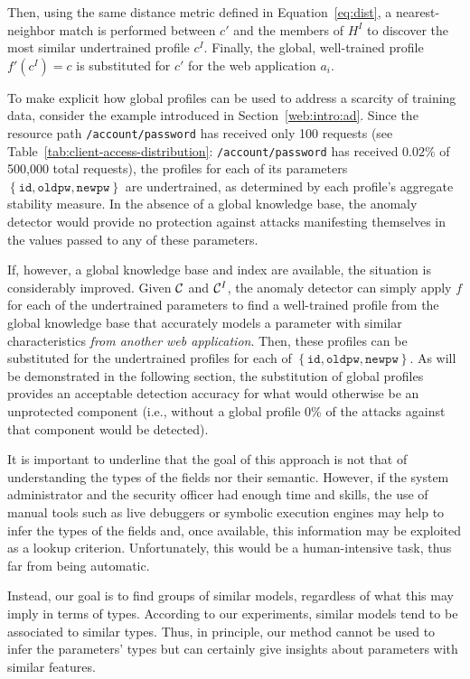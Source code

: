 Then, using the same distance metric defined in Equation~\eqref{eq:dist}, a nearest-neighbor match is performed between $c'$ and the members of $H^I$ to discover the most similar undertrained profile $c^I$.  Finally, the global, well-trained profile $f'\left(c^I\right)=c$ is substituted for $c'$ for the web application $a_i$.

To make explicit how global profiles can be used to address a scarcity
of training data, consider the example introduced in
Section~\ref{web:intro:ad}.  Since the resource path
\texttt{/account/password} has received only 100 requests (see
Table~\ref{tab:client-access-distribution}: \texttt{/account/password}
has received $0.02\%$ of 500,000 total requests), the profiles for
each of its parameters
$\left\{\mathtt{id},\mathtt{oldpw},\mathtt{newpw}\right\}$ are
undertrained, as determined by each profile's aggregate stability
measure.  In the absence of a global knowledge base, the anomaly
detector would provide no protection against attacks manifesting
themselves in the values passed to any of these parameters.

If, however, a global knowledge base and index are available, the situation is considerably improved.  Given $\mathcal{C}$ and $\mathcal{C}^I$, the anomaly detector can simply apply $f$ for each of the undertrained parameters to find a well-trained profile from the global knowledge base that accurately models a parameter with similar characteristics \emph{from another web application}.  Then, these profiles can be substituted for the undertrained profiles for each of $\left\{\mathtt{id},\mathtt{oldpw},\mathtt{newpw}\right\}$.  As will be demonstrated in the following section, the substitution of global profiles provides an acceptable detection accuracy for what would otherwise be an unprotected component (i.e., without a global profile 0\% of the attacks against that component would be detected).

\begin{note}
  It is important to underline that the goal of this approach is not
  that of understanding the types of the fields nor their
  semantic. However, if the system administrator and the security
  officer had enough time and skills, the use of manual tools such as
  live debuggers or symbolic execution engines may help to infer the
  types of the fields and, once available, this information may be
  exploited as a lookup criterion. Unfortunately, this would be a
  human-intensive task, thus far from being automatic.

  Instead, our goal is to find groups of similar models, regardless of
  what this may imply in terms of types. According to our experiments,
  similar models tend to be associated to similar types. Thus, in
  principle, our method cannot be used to infer the parameters' types
  but can certainly give insights about parameters with similar
  features.
\end{note}

